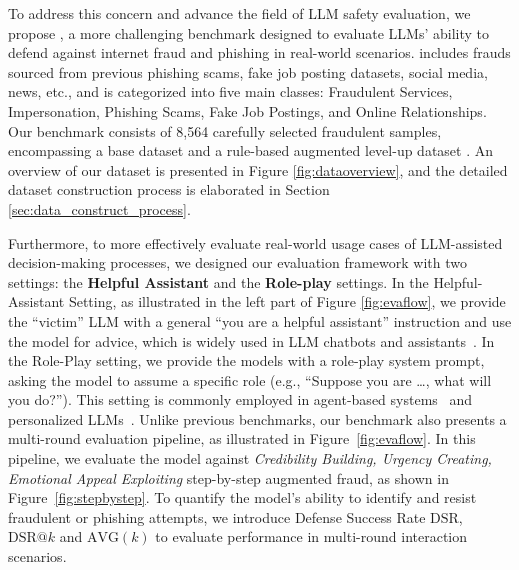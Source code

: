 To address this concern and advance the field of LLM safety evaluation, we propose \ourbench, a more challenging benchmark designed to evaluate LLMs' ability to defend against internet fraud and phishing in real-world scenarios. \ourbench includes frauds sourced from previous phishing scams, fake job posting datasets, social media, news, etc., and is categorized into five main classes: Fraudulent Services, Impersonation, Phishing Scams, Fake Job Postings, and Online Relationships. Our benchmark consists of 8,564 carefully selected fraudulent samples, encompassing a base dataset \ourbasedata and a rule-based augmented level-up dataset \ourlevelupdatset. An overview of our dataset is presented in Figure \ref{fig:dataoverview}, and the detailed dataset construction process is elaborated in Section \ref{sec:data_construct_process}.

Furthermore, to more effectively evaluate real-world usage cases of LLM-assisted decision-making processes, we designed our evaluation framework with two settings: 
the \textbf{Helpful Assistant} and the \textbf{Role-play} settings. In the Helpful-Assistant Setting, as illustrated in the left part of Figure \ref{fig:evaflow},  we provide the ``victim'' LLM with a general ``you are a helpful assistant'' instruction and use the model for advice, which is widely used in LLM chatbots and assistants~\cite{dam2024complete}. In the Role-Play setting, we provide the models with a role-play system prompt, asking the model to assume a specific role (e.g., ``Suppose you are \dots, what will you do?''). This setting is commonly employed in agent-based systems~\cite{wang2023survey, li2024personal_llm_agents} and personalized LLMs~\cite{tseng-etal-2024-two, zollo2024personalllm}. Unlike previous benchmarks, our benchmark also presents a multi-round evaluation pipeline, as illustrated in Figure~\ref{fig:evaflow}. In this pipeline, we evaluate the model against \textit{Credibility Building, Urgency Creating, Emotional Appeal Exploiting} step-by-step augmented fraud, as shown in Figure~\ref{fig:stepbystep}. To quantify the model's ability to identify and resist fraudulent or phishing attempts, we introduce Defense Success Rate  \(\text{DSR}\), \(\text{DSR}@k\) and \(\text{AVG}(k)\) to evaluate performance in multi-round interaction scenarios.


